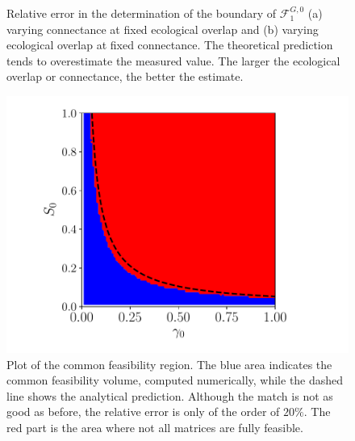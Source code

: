 \documentclass[12pt, titlepage]{report}
\begin{document}
\begin{figure}[h!]
	\captionsetup[subfigure]{captionskip = -165pt, margin = 45pt}
\captionsetup[subfigure]{captionskip = -175pt, margin = 45pt}
\caption{Relative error in the determination of the boundary of $\mathcal{F}^{G,0}_1$ (a) varying connectance at fixed ecological overlap and (b) varying ecological overlap at fixed connectance. The theoretical prediction tends to overestimate the measured value. The larger the ecological overlap or connectance, the better the estimate.}\label{fig: deviation away from theory feasibility}
\end{figure}
\begin{figure}[h!]
\centering
\includegraphics[width=0.6\linewidth]{common_feasibility_volume_no_syntrophy}
\caption{Plot of the common feasibility region. The blue area indicates the common feasibility volume, computed numerically, while the dashed line shows the analytical prediction. Although the match is not as good as before, the relative error is only of the order of $20 \%$. The red part is the area where not all matrices are fully feasible.}
\label{fig: common feasible volume no syntrophy}
\end{figure}
\end{document}
